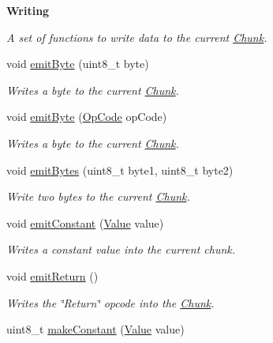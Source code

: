 \begin{Indent}\textbf{ Writing}\par
{\em A set of functions to write data to the current \hyperlink{class_chunk}{Chunk}. }\begin{DoxyCompactItemize}
\item 
void \hyperlink{class_compiler_aad39786eab85b1a3597a104f013286f9}{emit\+Byte} (uint8\+\_\+t byte)
\begin{DoxyCompactList}\small\item\em Writes a byte to the current \hyperlink{class_chunk}{Chunk}. \end{DoxyCompactList}\item 
void \hyperlink{class_compiler_ae6cb66fc6fd9d337517c0ea172aaea38}{emit\+Byte} (\hyperlink{_chunk_8h_a3d7c5cec8d9c1afc2c92ad39b9d64996}{Op\+Code} op\+Code)
\begin{DoxyCompactList}\small\item\em Writes a byte to the current \hyperlink{class_chunk}{Chunk}. \end{DoxyCompactList}\item 
void \hyperlink{class_compiler_a815a75c9444d281252990947b2cd9792}{emit\+Bytes} (uint8\+\_\+t byte1, uint8\+\_\+t byte2)
\begin{DoxyCompactList}\small\item\em Write two bytes to the current \hyperlink{class_chunk}{Chunk}. \end{DoxyCompactList}\item 
void \hyperlink{class_compiler_a2c44111e9882723961bc65bf1c4a5b51}{emit\+Constant} (\hyperlink{class_value}{Value} value)
\begin{DoxyCompactList}\small\item\em Writes a constant value into the current chunk. \end{DoxyCompactList}\item 
\mbox{\label{class_compiler_a4a49f4edafe9fc1fe1445fc2484a72c0}} 
void \hyperlink{class_compiler_a4a49f4edafe9fc1fe1445fc2484a72c0}{emit\+Return} ()
\begin{DoxyCompactList}\small\item\em Writes the \char`\"{}\+Return\char`\"{} opcode into the \hyperlink{class_chunk}{Chunk}. \end{DoxyCompactList}\item 
uint8\+\_\+t \hyperlink{class_compiler_aca18f596319bb5dc49e36130c875ddae}{make\+Constant} (\hyperlink{class_value}{Value} value)

\end{DoxyCompactItemize}
\end{Indent}
